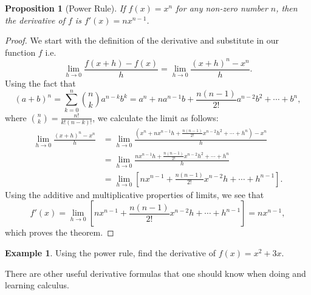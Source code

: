 \documentclass[12pt]{article}
\newtheorem{prop}[thm]{Proposition}
\theoremstyle{definition}
\newtheorem{exmp}[thm]{Example}
\theoremstyle{plain}
\numberwithin{equation}{section}
\begin{document}
\begin{prop}[Power Rule]\label{PowRule}
	If $f(x)=x^n$ for any non-zero number $n$, then the derivative of $f$ is  $f'(x)=nx^{n-1}$.
\end{prop}
\begin{proof}
	We start with the definition of the derivative and substitute in our function $f$ i.e.
	\begin{equation}
		\lim\limits_{h\to 0}\frac{f(x+h)-f(x)}{h}
=	\lim\limits_{h\to 0}\frac{(x+h)^n-x^n}{h}.
	\end{equation}
	Using the fact that \begin{equation}
		(a+b)^n=\sum^n_{k=0} \binom{n}{k}a^{n-k}b^k=a^n+na^{n-1}b+ \frac{n(n-1)}{2!}a^{n-2}b^2+\dotsb+b^n,
	\end{equation}
	where $\binom{n}{k}=\frac{n!}{k!(n-k)!}$,
	we calculate the limit as follows:
	\begin{align}
		\lim\limits_{h\to 0}\frac{(x+h)^n-x^n}{h}&=\lim\limits_{h\to 0}\frac{(x^n+nx^{n-1}h+ \frac{n(n-1)}{2!}x^{n-2}h^2+\dotsb+h^n)-x^n}{h}\\
	&=\lim\limits_{h\to 0}\frac{nx^{n-1}h+ \frac{n(n-1)}{2!}x^{n-2}h^2+\dotsb+h^n}{h}\\
	& =\lim\limits_{h\to 0} \left[ nx^{n-1}+ \frac{n(n-1)}{2!}x^{n-2}h+\dotsb+h^{n-1}\right] .
	\end{align}
Using the additive and multiplicative properties of limits, we see that
\begin{equation}
	f'(x)=\lim\limits_{h\to 0} \left[nx^{n-1}+ \frac{n(n-1)}{2!}x^{n-2}h+\dotsb+h^{n-1}\right]=nx^{n-1},
\end{equation}
which proves the theorem.
\end{proof}


\begin{exmp}
	Using the power rule, find the derivative of $f(x)=x^2+3x$.
\end{exmp}



There are other useful derivative formulas that one should know when doing and learning calculus.
\end{document}
